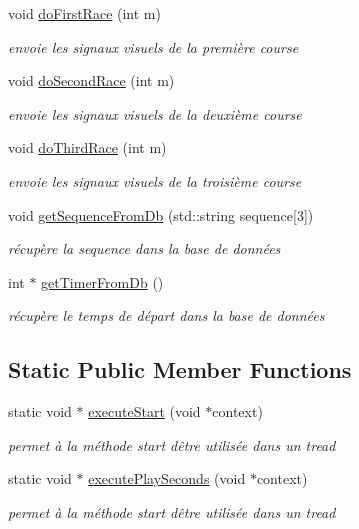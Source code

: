 \begin{DoxyCompactItemize}
void \hyperlink{class_flight_a8bde7d624b00590fae1da4eb9e682ceb}{do\+First\+Race} (int m)
\begin{DoxyCompactList}\small\item\em envoie les signaux visuels de la première course \end{DoxyCompactList}\item 
void \hyperlink{class_flight_a678e5da38ff7b0a9f2c605167e90a2a6}{do\+Second\+Race} (int m)
\begin{DoxyCompactList}\small\item\em envoie les signaux visuels de la deuxième course \end{DoxyCompactList}\item 
void \hyperlink{class_flight_a046562fcc923af19322ef74dea295809}{do\+Third\+Race} (int m)
\begin{DoxyCompactList}\small\item\em envoie les signaux visuels de la troisième course \end{DoxyCompactList}\item 
void \hyperlink{class_flight_a6c813df7df89bc3bc901387bb0854102}{get\+Sequence\+From\+Db} (std\+::string sequence\mbox{[}3\mbox{]})
\begin{DoxyCompactList}\small\item\em récupère la sequence dans la base de données \end{DoxyCompactList}\item 
int $\ast$ \hyperlink{class_flight_afab0d1a975b5165b7aba0844b7122eb9}{get\+Timer\+From\+Db} ()
\begin{DoxyCompactList}\small\item\em récupère le temps de départ dans la base de données \end{DoxyCompactList}\end{DoxyCompactItemize}
\subsection*{Static Public Member Functions}
\begin{DoxyCompactItemize}
\item 
static void $\ast$ \hyperlink{class_flight_a2cb1c243edbdb53858e2b97ebbe96cf6}{execute\+Start} (void $\ast$context)
\begin{DoxyCompactList}\small\item\em permet à la méthode start d\textquotesingle{}être utilisée dans un tread \end{DoxyCompactList}\item 
static void $\ast$ \hyperlink{class_flight_ac5fc14dc02d9a75a00ce6688003e8842}{execute\+Play\+Seconds} (void $\ast$context)
\begin{DoxyCompactList}\small\item\em permet à la méthode start d\textquotesingle{}être utilisée dans un tread \end{DoxyCompactList}\end{DoxyCompactItemize}


